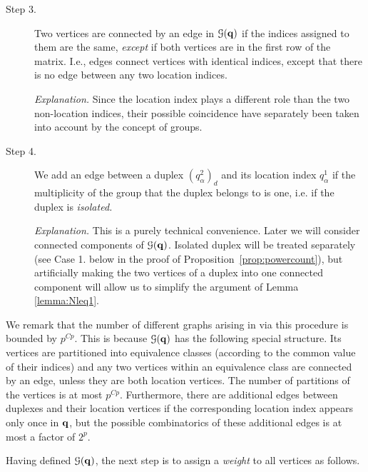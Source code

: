 \documentclass[draft]{article}
\newcommand{\bq}{{\bf {q}}}
\newcommand{\cG}{{\mathcal G}}
\numberwithin{equation}{section}
\numberwithin{theorem}{section}
\numberwithin{definition}{section}
\numberwithin{remark}{section}
\begin{document}
\begin{description}
\item [Step 3.]  Two vertices are connected by an edge in
$\cG(\bq)$ if the indices assigned to them are the same,
{\it except} if both vertices are in the first row of the matrix.
I.e., edges connect vertices with identical indices, except that
 there is no edge between any two location indices. 



{\it Explanation.} Since the location index plays a different
role than the two non-location indices, their
 possible coincidence 
 have separately been taken into account by the concept of groups.


 
 
 
 \item[Step 4.]   We add an edge between a duplex   $(q^2_{\alpha})_d$
 and its location index $q^1_{\alpha}$ if the multiplicity of 
 the group that the duplex belongs to  is one, i.e. if
the duplex is {\it isolated.}



{\it Explanation.} This is a purely technical convenience. Later
we will consider connected components of $\cG(\bq)$. Isolated duplex
will  be treated separately (see Case 1. below in the
proof of Proposition~\ref{prop:powercount}), but artificially
making the two vertices of a duplex into 
one connected component  will allow us to
simplify the argument of Lemma \ref{lemma:Nleq1}.



 
\end{description}










We remark that the number of different graphs arising in
via this procedure is bounded by $p^{Cp}$. This is because
$\cG(\bq)$ has the following special structure. Its vertices are
partitioned into equivalence classes
(according to the  common value of their indices)
and any  two vertices within an equivalence class
 are connected by an edge, unless
they are both location vertices. The  number of partitions
of the vertices is at most $p^{Cp}$.  Furthermore, there are
additional edges between duplexes and their location vertices
if the corresponding location index appears only once in $\bq$,
but the possible combinatorics of these additional edges
is at most a factor of $2^p$. 


Having defined $\cG(\bq)$, 
 the next step is to   
 assign a {\it weight}  to all vertices as follows.  
\end{document}
